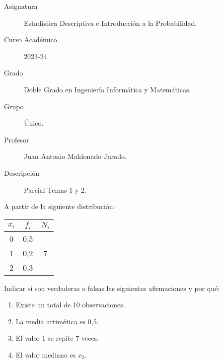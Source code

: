 \documentclass[12pt]{article}
\begin{document}

    
    

    \begin{description}
        \item[Asignatura] Estadística Descriptiva e Introducción a la Probabilidad.
        \item[Curso Académico] 2023-24.
        \item[Grado] Doble Grado en Ingeniería Informática y Matemáticas.
        \item[Grupo] Único.
        \item[Profesor] Juan Antonio Maldonado Jurado.
        \item[Descripción] Parcial Temas 1 y 2.
    
    \end{description}
    \newpage

    \begin{ejercicio}
        A partir de la siguiente distribución:

        \begin{center}
            \begin{tabular}{|c|c|c|}
                \hline
                \phantom{$x_i$} $x_i$ \phantom{$x_i$}  & \phantom{$x_i$} $f_i$ \phantom{$x_i$} & \phantom{$x_i$} $N_i$ \phantom{$x_i$} \\
                \hline
                0 & 0,5 & \\
                \hline
                1 & 0,2 & 7 \\
                \hline
                2 & 0,3 & \\
                \hline
            \end{tabular}
        \end{center}
        Indicar si son verdaderas o falsas las siguientes afirmaciones y por qué:
        \begin{enumerate}[label=\alph*)]
            \item Existe un total de 10 observaciones.
            \item La media artimética es 0,5.
            \item El valor 1 se repite 7 veces.
            \item El valor mediano es $x_2$.
        \end{enumerate}
    \end{ejercicio}
\end{document}

